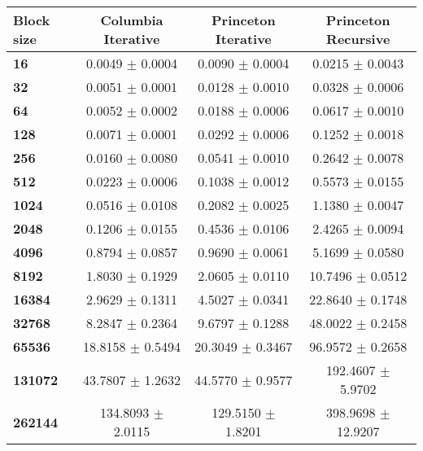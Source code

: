 \begin{tabular}{lccc}\toprule
\textbf{Block size}  & \textbf{Columbia Iterative} & \textbf{Princeton Iterative} & \textbf{Princeton Recursive}\\\midrule
\textbf{16}  & 0.0049 $\pm$ 0.0004 & 0.0090 $\pm$ 0.0004 & 0.0215 $\pm$ 0.0043\\
\textbf{32}  & 0.0051 $\pm$ 0.0001 & 0.0128 $\pm$ 0.0010 & 0.0328 $\pm$ 0.0006\\
\textbf{64}  & 0.0052 $\pm$ 0.0002 & 0.0188 $\pm$ 0.0006 & 0.0617 $\pm$ 0.0010\\
\textbf{128}  & 0.0071 $\pm$ 0.0001 & 0.0292 $\pm$ 0.0006 & 0.1252 $\pm$ 0.0018\\
\textbf{256}  & 0.0160 $\pm$ 0.0080 & 0.0541 $\pm$ 0.0010 & 0.2642 $\pm$ 0.0078\\
\textbf{512}  & 0.0223 $\pm$ 0.0006 & 0.1038 $\pm$ 0.0012 & 0.5573 $\pm$ 0.0155\\
\textbf{1024}  & 0.0516 $\pm$ 0.0108 & 0.2082 $\pm$ 0.0025 & 1.1380 $\pm$ 0.0047\\
\textbf{2048}  & 0.1206 $\pm$ 0.0155 & 0.4536 $\pm$ 0.0106 & 2.4265 $\pm$ 0.0094\\
\textbf{4096}  & 0.8794 $\pm$ 0.0857 & 0.9690 $\pm$ 0.0061 & 5.1699 $\pm$ 0.0580\\
\textbf{8192}  & 1.8030 $\pm$ 0.1929 & 2.0605 $\pm$ 0.0110 & 10.7496 $\pm$ 0.0512\\
\textbf{16384}  & 2.9629 $\pm$ 0.1311 & 4.5027 $\pm$ 0.0341 & 22.8640 $\pm$ 0.1748\\
\textbf{32768}  & 8.2847 $\pm$ 0.2364 & 9.6797 $\pm$ 0.1288 & 48.0022 $\pm$ 0.2458\\
\textbf{65536}  & 18.8158 $\pm$ 0.5494 & 20.3049 $\pm$ 0.3467 & 96.9572 $\pm$ 0.2658\\
\textbf{131072}  & 43.7807 $\pm$ 1.2632 & 44.5770 $\pm$ 0.9577 & 192.4607 $\pm$ 5.9702\\
\textbf{262144} & 134.8093 $\pm$ 2.0115 & 129.5150 $\pm$ 1.8201 & 398.9698 $\pm$ 12.9207\\
\bottomrule
\end{tabular}
